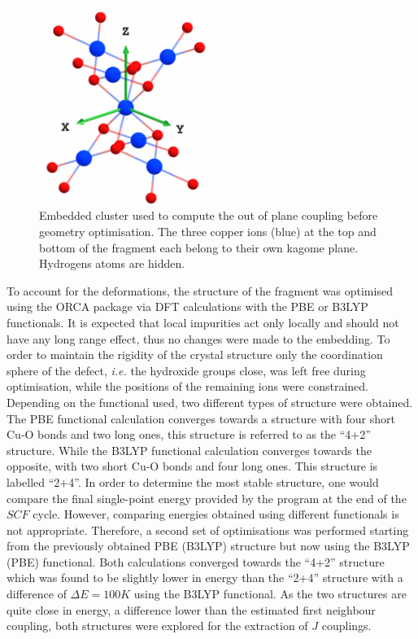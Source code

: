 \documentclass[12pt]{report}
\numberwithin{equation}{section}
\begin{document}
\begin{figure}[!ht]
    \centering
    \includegraphics[width=0.5\textwidth]{Images/Fragment_AvOpt.png}
    \caption[Embedded cluster used to compute the out of plane coupling before geometry optimisation]{Embedded cluster used to compute the out of plane coupling before geometry optimisation. The three copper ions (blue) at the top and bottom of the fragment each belong to their own kagome plane. Hydrogens atoms are hidden.}
    \label{fig:FragAv}
\end{figure}

To account for the deformations, the structure of the fragment was optimised using the ORCA package via DFT calculations with the PBE or B3LYP functionals.
It is expected that local impurities act only locally and should not have any long range effect, thus no changes were made to the embedding.
To order to maintain the rigidity of the crystal structure only the coordination sphere of the defect, \textit{i.e.} the hydroxide groups close, was left free during optimisation, while the positions of the remaining ions were constrained.
Depending on the functional used, two different types of structure were obtained.
The PBE functional calculation converges towards a structure with four short Cu-O bonds and two long ones, this structure is referred to as the ``4+2'' structure.
While the B3LYP functional calculation converges towards the opposite, with two short Cu-O bonds and four long ones. This structure is labelled ``2+4''.
In order to determine the most stable structure, one would compare the final single-point energy provided by the program at the end of the $SCF$ cycle.
However, comparing energies obtained using different functionals is not appropriate.
Therefore, a second set of optimisations was performed starting from the previously obtained PBE (B3LYP) structure but now using the B3LYP (PBE) functional.
Both calculations converged towards the ``4+2'' structure which was found to be slightly lower in energy than the ``2+4'' structure with a difference of $\Delta E=100 K$ using the B3LYP functional.
As the two structures are quite close in energy, a difference lower than the estimated first neighbour coupling, both structures were explored for the extraction of $J$ couplings.
\end{document}
